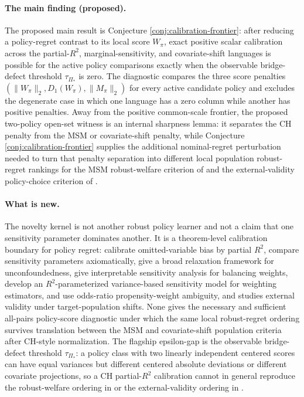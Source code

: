 \documentclass[11pt]{article}
\theoremstyle{definition}
\theoremstyle{plain}
\theoremstyle{remark}
\begin{document}
\paragraph{The main finding (proposed).}
The proposed main result is Conjecture \ref{conj:calibration-frontier}: after reducing a policy-regret contrast to its local score $W_{\pi}$, exact positive scalar calibration across the partial-$R^2$, marginal-sensitivity, and covariate-shift languages is possible for the active policy comparisons exactly when the observable bridge-defect threshold $\tau_{\Pi_\ast}$ is zero.  The diagnostic compares the three score penalties $(\|W_{\pi}\|_2,D_1(W_{\pi}),\|M_{\pi}\|_2)$ for every active candidate policy and excludes the degenerate case in which one language has a zero column while another has positive penalties.  Away from the positive common-scale frontier, the proposed two-policy open-set witness is an internal sharpness lemma: it separates the CH penalty from the MSM or covariate-shift penalty, while Conjecture \ref{conj:calibration-frontier} supplies the additional nominal-regret perturbation needed to turn that penalty separation into different local population robust-regret rankings for the MSM robust-welfare criterion of \citet{JinXuZhengZhou2025} and the external-validity policy-choice criterion of \citet{AdjahoChristensen2025}.

\paragraph{What is new.}
The novelty kernel is not another robust policy learner and not a claim that one sensitivity parameter dominates another.  It is a theorem-level calibration boundary for policy regret: \citet{CinelliHazlett2020} calibrate omitted-variable bias by partial $R^2$, \citet{DiegertMastenPoirier2025} compare sensitivity parameters axiomatically, \citet{MastenPoirierRen2025} give a broad relaxation framework for unconfoundedness, \citet{SorianoBenMichaelBickelFellerPimentel2023} give interpretable sensitivity analysis for balancing weights, \citet{HuangPimentel2025} develop an $R^2$-parameterized variance-based sensitivity model for weighting estimators, \citet{ZhaoSmallBhattacharya2019} and \citet{KallusZhou2021} use odds-ratio propensity-weight ambiguity, and \citet{AdjahoChristensen2025} studies external validity under target-population shifts.  None gives the necessary and sufficient all-pairs policy-score diagnostic under which the same local robust-regret ordering survives translation between the MSM and covariate-shift population criteria after CH-style normalization.  The flagship epsilon-gap is the observable bridge-defect threshold $\tau_{\Pi_\ast}$: a policy class with two linearly independent centered scores can have equal variances but different centered absolute deviations or different covariate projections, so a CH partial-$R^2$ calibration cannot in general reproduce the robust-welfare ordering in \citet{JinXuZhengZhou2025} or the external-validity ordering in \citet{AdjahoChristensen2025}.
\end{document}
